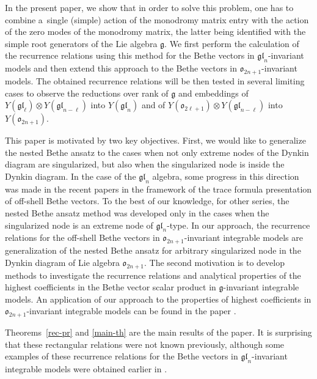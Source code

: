 \documentclass[10pt,a4paper]{amsart}
\theoremstyle{definition}
\begin{document}
In the present paper, we show that in order to solve this problem, one has to combine a~single
(simple) action of the monodromy matrix entry with the action of the zero modes of the
monodromy matrix, the latter being identified with the simple root generators of the Lie algebra
$\mathfrak{g}$. We first perform the calculation of the recurrence relations
using this method for the Bethe vectors in $\mathfrak{gl}_n$-invariant models
and then extend this approach to the Bethe vectors in
$\mathfrak{o}_{2n+1}$-invariant models. The obtained recurrence relations will
be then tested in several limiting cases to observe the reductions over rank of
$\mathfrak{g}$ and embeddings of $Y(\mathfrak{gl}_{\ell})\otimes
Y(\mathfrak{gl}_{n-\ell})$ into $Y(\mathfrak{gl}_{n})$ and
 of $Y(\mathfrak{o}_{2\ell+1})\otimes Y(\mathfrak{gl}_{n-\ell})$
into $Y(\mathfrak{o}_{2n+1})$.


This paper is motivated by two key objectives. First, we would like to
generalize the nested Bethe ansatz to the cases when not only extreme nodes
of the Dynkin diagram are singularized, but also when the singularized node is inside the
Dynkin diagram. In the case of the $\mathfrak{gl}_n$ algebra, some progress in this direction was made in the recent papers \cite{KT1,KT2} in the framework of the trace formula presentation of off-shell Bethe vectors. To the best of our knowledge,
for other series, the nested Bethe ansatz method was developed
 only in the cases when the singularized node is an extreme node of $\mathfrak{gl}_n$-type.
 In our approach, the recurrence relations for the off-shell Bethe vectors in
 $\mathfrak{o}_{2n+1}$-invariant integrable models are generalization of the
 nested Bethe ansatz for arbitrary singularized node in the Dynkin diagram
 of Lie algebra $\mathfrak{o}_{2n+1}$. The second motivation is to develop
 methods to investigate the recurrence relations and analytical properties
 of the highest coefficients in the Bethe vector scalar product in
 $\mathfrak{g}$-invariant integrable models. An application of our approach
 to the properties of highest coefficients in $\mathfrak{o}_{2n+1}$-invariant
 integrable models can be found in the paper \cite{LPR25}.


Theorems~\ref{rec-pr} and \ref{main-th} are the main results of the paper.
It is surprising that these rectangular relations were not known previously,
although some examples of these recurrence relations for the Bethe
vectors in $\mathfrak{gl}_n$-invariant integrable models were obtained earlier
in \cite{G23,HLPRS-SP17}.
\end{document}
